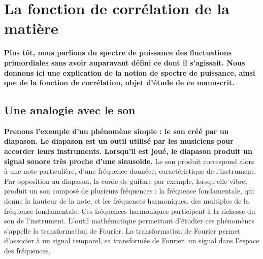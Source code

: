 \documentclass[11pt, twoside, a4paper, openright]{report}
\begin{document}
\section{La fonction de corrélation de la matière}

\textbf{Plus tôt, nous parlions du spectre de puissance des fluctuations primordiales sans avoir auparavant défini ce dont il s'agissait. Nous donnons ici une explication de la notion de spectre de puissance, ainsi que de la fonction de corrélation, objet d'étude de ce manuscrit.}

\subsection{Une analogie avec le son}

\textbf{Prenons l'exemple d'un phénomène simple : le son créé par un diapason. Le diapason est un outil utilisé par les musiciens pour accorder leurs instruments. Lorsqu'il est joué, le diapason produit un signal sonore très proche d'une sinusoïde.}
Le son produit correspond alors à une note particulière, d'une fréquence donnéee, caractéristique de l'instrument. Par opposition au diapason, la corde de guitare par exemple, lorsqu'elle vibre, produit un son composé de plusieurs fréquences : la fréquence fondamentale, qui donne la hauteur de la note, et les fréquences harmoniques, des multiples de la fréquence fondamentale. Ces fréquences harmoniques participent à la richesse du son de l'instrument. L'outil mathématique permettant d'étudier ces phénomènes s'appelle la transformation de Fourier. La transformation de Fourier permet d'associer à un signal temporel, sa transformée de Fourier, un signal dans l'espace des fréquences.
\end{document}
